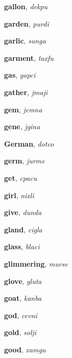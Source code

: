 \documentclass[12pt]{book}
\begin{document}
\begin{description}

\item[ ] \textbf{gallon}, \textit{dekpu}

\item[ ] \textbf{garden}, \textit{purdi}

\item[ ] \textbf{garlic}, \textit{sunga}

\item[ ] \textbf{garment}, \textit{taxfu}

\item[ ] \textbf{gas}, \textit{gapci}

\item[ ] \textbf{gather}, \textit{jmaji}

\item[ ] \textbf{gem}, \textit{jemna}

\item[ ] \textbf{gene}, \textit{jgina}

\item[ ] \textbf{German}, \textit{dotco}

\item[ ] \textbf{germ}, \textit{jurme}

\item[ ] \textbf{get}, \textit{cpacu}

\item[ ] \textbf{girl}, \textit{nixli}

\item[ ] \textbf{give}, \textit{dunda}

\item[ ] \textbf{gland}, \textit{cigla}

\item[ ] \textbf{glass}, \textit{blaci}

\item[ ] \textbf{glimmering}, \textit{murse}

\item[ ] \textbf{glove}, \textit{gluta}

\item[ ] \textbf{goat}, \textit{kanba}

\item[ ] \textbf{god}, \textit{cevni}

\item[ ] \textbf{gold}, \textit{solji}

\item[ ] \textbf{good}, \textit{xamgu}


\end{description}
\end{document}
